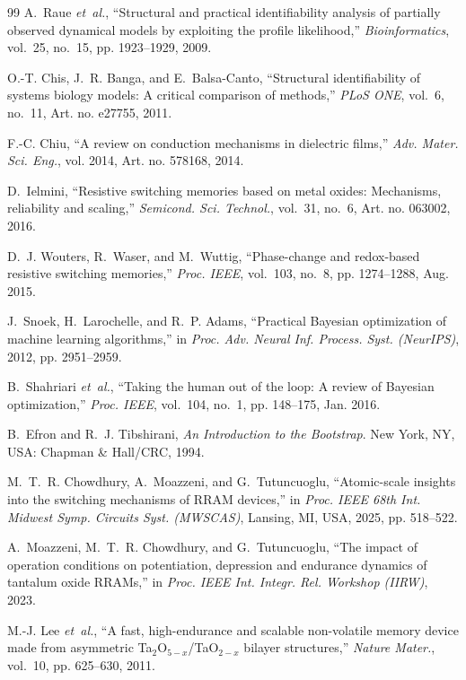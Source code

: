 \documentclass[journal]{IEEEtran}
\begin{document}
\begin{thebibliography}{99}
A.~Raue \emph{et~al.}, ``Structural and practical identifiability analysis of
partially observed dynamical models by exploiting the profile likelihood,''
\emph{Bioinformatics}, vol.~25, no.~15, pp. 1923--1929, 2009.

O.-T. Chis, J.~R. Banga, and E.~Balsa-Canto, ``Structural identifiability of
systems biology models: A critical comparison of methods,'' \emph{PLoS ONE},
vol.~6, no.~11, Art. no. e27755, 2011.

F.-C. Chiu, ``A review on conduction mechanisms in dielectric films,''
\emph{Adv. Mater. Sci. Eng.}, vol. 2014, Art. no. 578168, 2014.

D.~Ielmini, ``Resistive switching memories based on metal oxides: Mechanisms,
reliability and scaling,'' \emph{Semicond. Sci. Technol.}, vol.~31, no.~6,
Art. no. 063002, 2016.

D.~J. Wouters, R.~Waser, and M.~Wuttig, ``Phase-change and redox-based
resistive switching memories,'' \emph{Proc. IEEE}, vol.~103, no.~8,
pp. 1274--1288, Aug. 2015.

J.~Snoek, H.~Larochelle, and R.~P. Adams, ``Practical Bayesian optimization
of machine learning algorithms,'' in \emph{Proc. Adv. Neural Inf. Process.
Syst. (NeurIPS)}, 2012, pp. 2951--2959.

B.~Shahriari \emph{et~al.}, ``Taking the human out of the loop: A review of
Bayesian optimization,'' \emph{Proc. IEEE}, vol.~104, no.~1, pp. 148--175,
Jan. 2016.

B.~Efron and R.~J. Tibshirani, \emph{An Introduction to the Bootstrap}.
New York, NY, USA: Chapman \& Hall/CRC, 1994.

M.~T.~R. Chowdhury, A.~Moazzeni, and G.~Tutuncuoglu, ``Atomic-scale insights
into the switching mechanisms of RRAM devices,'' in \emph{Proc. IEEE 68th
Int. Midwest Symp. Circuits Syst. (MWSCAS)}, Lansing, MI, USA, 2025,
pp. 518--522.

A.~Moazzeni, M.~T.~R. Chowdhury, and G.~Tutuncuoglu, ``The impact of
operation conditions on potentiation, depression and endurance dynamics of
tantalum oxide RRAMs,'' in \emph{Proc. IEEE Int. Integr. Rel. Workshop
(IIRW)}, 2023.

M.-J. Lee \emph{et~al.}, ``A fast, high-endurance and scalable non-volatile
memory device made from asymmetric Ta$_2$O$_{5-x}$/TaO$_{2-x}$ bilayer
structures,'' \emph{Nature Mater.}, vol.~10, pp. 625--630, 2011.

\end{thebibliography}
\end{document}

